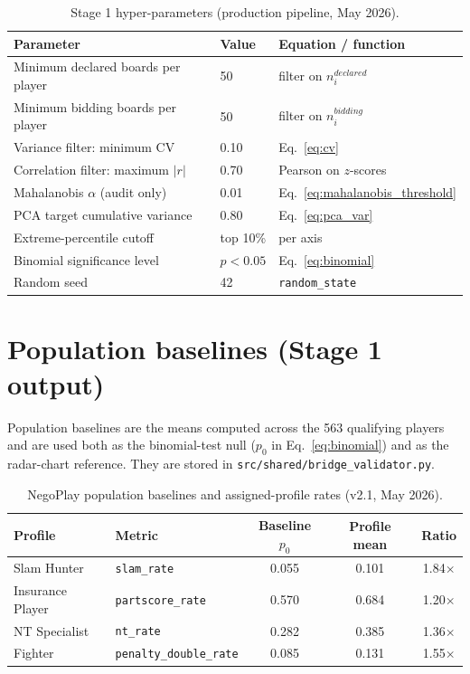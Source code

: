 \documentclass[11pt, a4paper, oneside, openany]{report}
\begin{document}
\begin{table}[H]
\centering\small
\caption{Stage 1 hyper-parameters (production pipeline, May 2026).}
\label{tab:stage1_hyper}
\begin{tabular}{p{6.5cm} l p{4.5cm}}
\toprule
\textbf{Parameter} & \textbf{Value} & \textbf{Equation / function} \\
\midrule
Minimum declared boards per player & 50 & filter on $n_i^{declared}$ \\
Minimum bidding boards per player  & 50 & filter on $n_i^{bidding}$ \\
Variance filter: minimum CV       & 0.10 & Eq.~\eqref{eq:cv} \\
Correlation filter: maximum $|r|$ & 0.70 & Pearson on $z$-scores \\
Mahalanobis $\alpha$ (audit only) & 0.01 & Eq.~\eqref{eq:mahalanobis_threshold} \\
PCA target cumulative variance    & 0.80 & Eq.~\eqref{eq:pca_var} \\
Extreme-percentile cutoff         & top 10\% & per axis \\
Binomial significance level       & $p < 0.05$ & Eq.~\eqref{eq:binomial} \\
Random seed                       & 42 & \texttt{random\_state} \\
\bottomrule
\end{tabular}
\end{table}

\section{Population baselines (Stage 1 output)}

Population baselines are the means computed across the 563 qualifying players and are used both as the binomial-test null ($p_0$ in Eq.~\ref{eq:binomial}) and as the radar-chart reference. They are stored in \texttt{src/shared/bridge\_validator.py}.

\begin{table}[H]
\centering\small
\caption{NegoPlay population baselines and assigned-profile rates (v2.1, May 2026).}
\label{tab:baselines}
\begin{tabular}{l l c c c}
\toprule
\textbf{Profile} & \textbf{Metric} & \textbf{Baseline $p_0$} & \textbf{Profile mean} & \textbf{Ratio} \\
\midrule
Slam Hunter      & \texttt{slam\_rate}           & 0.055 & 0.101 & 1.84$\times$ \\
Insurance Player & \texttt{partscore\_rate}      & 0.570 & 0.684 & 1.20$\times$ \\
NT Specialist    & \texttt{nt\_rate}             & 0.282 & 0.385 & 1.36$\times$ \\
Fighter          & \texttt{penalty\_double\_rate} & 0.085 & 0.131 & 1.55$\times$ \\
\bottomrule
\end{tabular}
\end{table}
\end{document}

